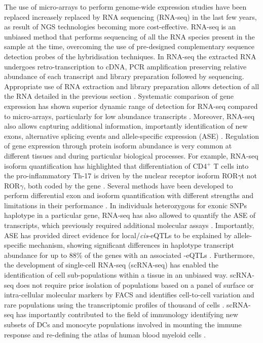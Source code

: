 The use of micro-arrays to perform genome-wide expression studies have been replaced increasely replaced by RNA sequencing (RNA-seq) in the last few years, as result of NGS technologies becoming more cost-effective. RNA-seq is an unbiased method that performs sequencing of all the RNA species present in the sample at the time, overcoming the use of pre-designed complementary sequence detection probes of the hybridisation techniques. In RNA-seq the extracted RNA undergoes retro-transcription to cDNA, PCR amplification preserving relative abundance of each transcript and library preparation followed by sequencing. Appropriate use of RNA extraction and library preparation allows detection of all the RNA detailed in the previous section \parencite{}. Systematic comparison of gene expression has shown superior dynamic range of detection for RNA-seq compared to micro-arrays, particularly for low abundance transcripts \parencite{Zhao2014}. Moreover, RNA-seq also allows capturing additional information, importantly identification of new exons, alternative splicing events and allele-specific expression (ASE) . %
Regulation of gene expression through protein isoform abundance is very common at different tissues and during particular biological processes. For example, RNA-seq isoform quantification has highlighted that differentiation of CD4$^+$ T cells into the pro-inflammatory Th-17 is driven by the nuclear receptor isoform ROR$\gamma$t not ROR$\gamma$, both coded by the  gene \parencite{Zhao2014}. Several methods have been developed to perform differential exon and isoform quantification with different strengths and limitations in their performance \parencite{Steijger2013,Ding2017}. In individuals heterozygous for exonic SNPs haplotype in a particular gene, RNA-seq has also allowed to quantify the ASE of transcripts, which previously required additional molecular assays \parencite{Yan2002}. Importantly, ASE has provided direct evidence for local/\textit{cis}-eQTLs to be explained by allele-specific mechanism, showing significant differences in haplotype transcript abundance for up to 88\% of the genes with an associated -eQTLs \parencite{Pickrell2010}. Furthermore, the development of single-cell RNA-seq (scRNA-seq) has enabled the identification of cell sub-populations within a tissue in an unbiased way. scRNA-seq does not require prior isolation of populations based on a panel of surface or intra-cellular molecular markers by FACS and identifies cell-to-cell variation and rare populations using the transcriptomic profiles of thousand of cells \parencite{Tang2009}. scRNA-seq has importantly contributed to the field of immunology identifying new subsets of DCs and monocyte populations involved in mounting the immune response and re-defining the atlas of human blood myeloid cells \parencite{Jaitin2014, Villani2017}. 
